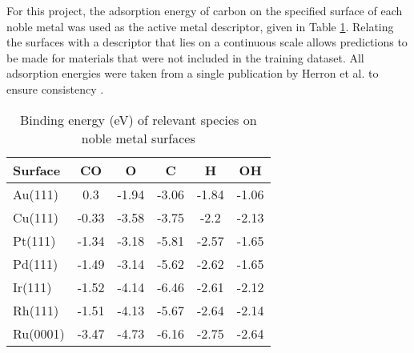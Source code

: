 	For this project, the adsorption energy of carbon on the specified surface of each noble metal was used as the active metal descriptor, given in Table \ref{table:BEs}. Relating the surfaces with a descriptor that lies on a continuous scale allows predictions to be made for materials that were not included in the training dataset. All adsorption energies were taken from a single publication by Herron et al. to ensure consistency \cite{Herron_2014}. 
			\begin{table}[ht]
				\centering
				\caption{Binding energy (eV) of relevant species on noble metal surfaces \cite{Herron_2014}}
				\label{table:BEs}
				\begin{tabular}{l|ccccc}
				\textbf{Surface} & \textbf{CO} & \textbf{O} & \textbf{C} & \textbf{H} & \textbf{OH} \\ \hline
				Au(111)          & 0.3         & -1.94      & -3.06      & -1.84      & -1.06       \\
				Cu(111)          & -0.33       & -3.58      & -3.75      & -2.2       & -2.13       \\
				Pt(111)          & -1.34       & -3.18      & -5.81      & -2.57      & -1.65       \\
				Pd(111)          & -1.49       & -3.14      & -5.62      & -2.62      & -1.65       \\
				Ir(111)          & -1.52       & -4.14      & -6.46      & -2.61      & -2.12       \\
				Rh(111)          & -1.51       & -4.13      & -5.67      & -2.64      & -2.14       \\
				Ru(0001)         & -3.47       & -4.73      & -6.16      & -2.75      & -2.64      
				\end{tabular}
				\end{table}

